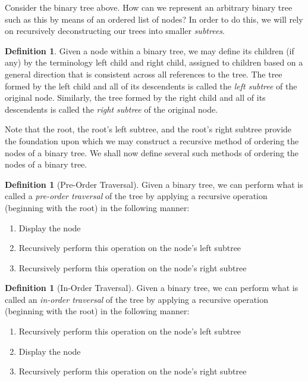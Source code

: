 \documentclass[12pt]{article}
\theoremstyle{definition}
\newtheorem{definition}[theorem]{Definition}
\theoremstyle{remark}
\begin{document}
Consider the binary tree above. How can we represent an arbitrary binary tree such as this by means of an ordered list of nodes? In order to do this, we will rely on recursively deconstructing our trees into smaller \emph{subtrees}.

\begin{definition}
Given a node within a binary tree, we may define its children (if any) by the terminology left child and right child, assigned to children based on a general direction that is consistent across all references to the tree. The tree formed by the left child and all of its descendents is called the \emph{left subtree} of the original
node. Similarly, the tree formed by the right child and all of its descendents is called the \emph{right subtree} of the original node.
\end{definition}

Note that the root, the root's left subtree, and the root's right subtree provide the foundation upon which we may construct a recursive method of ordering the nodes of a binary tree. We shall now define several such methods of ordering the nodes of a binary tree.

\begin{definition}[Pre-Order Traversal]
Given a binary tree, we can perform what is called a \emph{pre-order traversal} of the tree by applying a recursive operation (beginning with the root) in the following manner:
\begin{enumerate}
	\item{Display the node}
	\item{Recursively perform this operation on the node's left subtree}
	\item{Recursively perform this operation on the node's right subtree}
\end{enumerate}
\end{definition}

\begin{definition}[In-Order Traversal]
Given a binary tree, we can perform what is called an \emph{in-order traversal} of the tree by applying a recursive operation (beginning with the root) in the following manner:
\begin{enumerate}
	\item{Recursively perform this operation on the node's left subtree}
	\item{Display the node}
	\item{Recursively perform this operation on the node's right subtree}
\end{enumerate}
\end{definition}
\end{document}
